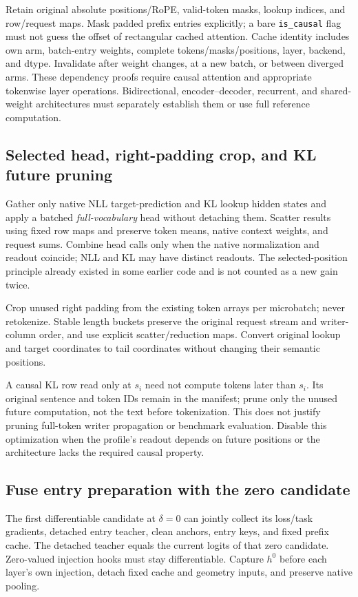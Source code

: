 \documentclass[11pt]{article}
\begin{document}
Retain original absolute positions/RoPE, valid-token masks, lookup indices,
and row/request maps. Mask padded prefix entries explicitly; a bare
\texttt{is\_causal} flag must not guess the offset of rectangular cached
attention. Cache identity includes own arm, batch-entry weights, complete
tokens/masks/positions, layer, backend, and dtype. Invalidate after weight
changes, at a new batch, or between diverged arms. These dependency proofs
require causal attention and appropriate tokenwise layer operations.
Bidirectional, encoder--decoder, recurrent, and shared-weight architectures
must separately establish them or use full reference computation.

\subsection{Selected head, right-padding crop, and KL future pruning}

Gather only native NLL target-prediction and KL lookup hidden states and
apply a batched \emph{full-vocabulary} head without detaching them. Scatter
results using fixed row maps and preserve token means, native context
weights, and request sums. Combine head calls only when the native
normalization and readout coincide; NLL and KL may have distinct readouts.
The selected-position principle already existed in some earlier code and
is not counted as a new gain twice.

Crop unused right padding from the existing token arrays per microbatch;
never retokenize. Stable length buckets preserve the original request
stream and writer-column order, and use explicit scatter/reduction maps.
Convert original lookup and target coordinates to tail coordinates without
changing their semantic positions.

A causal KL row read only at $s_i$ need not compute tokens later than $s_i$.
Its original sentence and token IDs remain in the manifest; prune only the
unused future computation, not the text before tokenization. This does not
justify pruning full-token writer propagation or benchmark evaluation.
Disable this optimization when the profile's readout depends on future
positions or the architecture lacks the required causal property.

\subsection{Fuse entry preparation with the zero candidate}

The first differentiable candidate at $\delta=0$ can jointly collect its
loss/task gradients, detached entry teacher, clean anchors, entry keys,
and fixed prefix cache. The detached teacher equals the current logits of
that zero candidate. Zero-valued injection hooks must stay differentiable.
Capture $h^0$ before each layer's own injection, detach fixed cache and
geometry inputs, and preserve native pooling.
\end{document}

